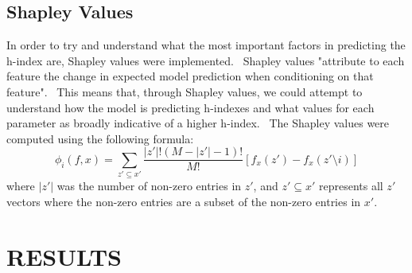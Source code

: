 \documentclass[9pt,twocolumn,twoside]{pnas-new}
\begin{document}
\subsection*{Shapley Values}
In order to try and understand what the most important factors in predicting the h-index are, Shapley values were implemented.  Shapley values "attribute to each feature the change in expected model prediction when conditioning on that feature"\cite{lundberg2017unifiedapproachinterpretingmodel}.  This means that, through Shapley values, we could attempt to understand how the model is predicting h-indexes and what values for each parameter as broadly indicative of a higher h-index.  The Shapley values were computed using the following formula\cite{lundberg2017unifiedapproachinterpretingmodel}:
\begin{equation}
\phi_i(f,x) = \sum_{z' \subseteq x'} \frac{|z'|!(M - |z'| - 1)!}{M!} \left[ f_x(z') - f_x(z' \setminus i) \right]
\label{eq:shapley}
\end{equation}
where $|z'|$ was the number of non-zero entries in $z'$, and $z' \subseteq x'$ represents all $z'$ vectors where the non-zero entries are a subset of the non-zero entries in $x'$.
 

 \section*{RESULTS}
\end{document}
